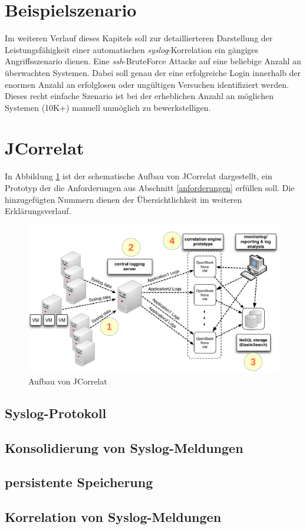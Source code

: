 \section{Beispielszenario}\label{szenario}

Im weiteren Verlauf dieses Kapitels soll zur detaillierteren Darstellung der 
Leistungsfähigkeit einer automatischen \textit{syslog}-Korrelation ein gängiges 
Angriffsszenario dienen. Eine \textit{ssh}-BruteForce Attacke auf eine beliebige Anzahl
an überwachten Systemen. Dabei soll genau der eine erfolgreiche Login innerhalb  der 
enormen Anzahl an erfolglosen oder ungültigen Versuchen identifiziert werden. Dieses 
recht einfache Szenario ist bei der erheblichen Anzahl an möglichen Systemen (10K+) 
manuell unmöglich zu bewerkstelligen.

\newpage
\section{JCorrelat}\label{sec_jcorrelat}

In Abbildung \ref{pic:jcorrelat} \cite[47]{reissmann} ist der schematische Aufbau von 
JCorrelat dargestellt, ein Prototyp der die Anforderungen aus Abschnitt 
\ref{anforderungen} erfüllen soll. Die hinzugefügten Nummern dienen der Übersichtlichkeit 
im weiteren Erklärungsverlauf.   

\begin{figure}[htbp]
    \caption{Aufbau von JCorrelat}
    \label{pic:jcorrelat}\vspace{0.2cm}
    \centering
    \includegraphics[scale=0.36]{img/schema-correlat}
    
\end{figure}

\subsection{Syslog-Protokoll} \label{syslog-proto}




\subsection{Konsolidierung von Syslog-Meldungen}\label{syslog-konsolidierung}
\subsection{persistente Speicherung}\label{nosql}
\subsection{Korrelation von Syslog-Meldungen}\label{syslog-korrelation}